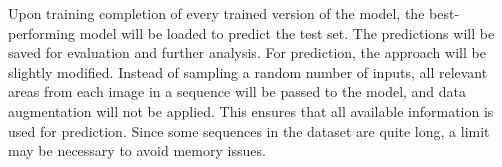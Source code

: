 \documentclass{article}
\begin{document}
Upon training completion of every trained version of the model, the best-performing model will be loaded to predict 
the test set. The predictions will be saved for evaluation and further analysis.
For prediction, the approach will be slightly modified. Instead of sampling a random number of inputs, all relevant 
areas from each image in a sequence will be passed to the model, and data augmentation will not be applied.
This ensures that all available information is used for prediction. Since some sequences in the dataset
are quite long, a limit may be necessary to avoid memory issues.


\printbibliography
\end{document}
